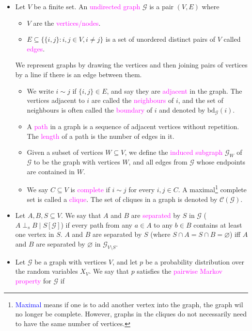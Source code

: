 \documentclass[UTF8]{book}
\newcommand{\concept}[1]{\textcolor{magenta}{#1}}
\renewcommand{\emph}[1]{\textcolor{blue}{#1}}
\begin{document}
\begin{itemize}
\item Let $V$ be a finite set. An \concept{undirected graph} $\mathcal{G}$ is a pair $(V,E)$ where
\begin{itemize}
	\item $V$ are the \concept{vertices/nodes}.
	\item $E\subseteq\{\{i,j\}: i,j\in V, i\neq j\}$ is a set of unordered distinct pairs of $V$ called \concept{edges}.
\end{itemize}
We represent graphs by drawing the vertices and then joining pairs of vertices by a line if there is an edge between them.
\begin{itemize}
	\item We write $i\sim j$ if $\{i,j\}\in E$, and say they are \concept{adjacent} in the graph. The vertices adjacent to $i$ are called the \concept{neighbours} of $i$, and the set of neighbours is often called the \concept{boundary} of $i$ and denoted by $\mathrm{bd}_{\mathcal{G}}(i)$.
	\item A \concept{path} in a graph is a sequence of adjacent vertices without repetition. The \concept{length} of a path is the number of edges in it.
	\item Given a subset of vertices $W\subseteq V$, we define the \concept{induced subgraph} $\mathcal{G}_W$ of $\mathcal{G}$ to be the graph with vertices $W$, and all edges from $\mathcal{G}$ whose endpoints are contained in $W$.
	\item We say $C\subseteq V$ is \concept{complete} if $i\sim j$ for every $i,j\in C$. A maximal\footnote{\emph{Maximal} means if one is to add another vertex into the graph, the graph wil no longer be complete. However, graphs in the cliques do not necessarily need to have the same number of vertices.} complete set is called a \concept{clique}. The set of cliques in a graph is denoted by $\mathcal{C}(\mathcal{G})$.
\end{itemize}
\item Let $A,B,S\subseteq V$. We say that $A$ and $B$ are \concept{separated} by $S$ in $\mathcal{G}$ ($A\perp_s B\mid S[\mathcal{G}]$) if every path from any $a\in A$ to any $b\in B$ contains at least one vertex in $S$. $A$ and $B$ are separated by $S$ (where $S\cap A=S\cap B=\varnothing$) iff $A$ and $B$ are separated by $\varnothing$ in $\mathcal{G}_{V\setminus S}$.
\item Let $\mathcal{G}$ be a graph with vertices $V$, and let $p$ be a probability distribution over the random variables $X_V$. We say that $p$ satisfies the \concept{pairwise Markov property} for $\mathcal{G}$ if

\end{itemize}
\end{document}
